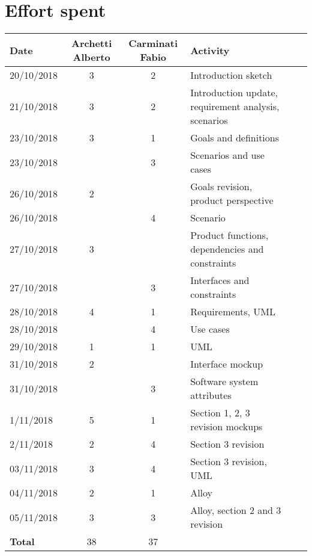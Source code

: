 
\section*{Effort spent}

\label{sec:effort}

\begin{table}[h!]
\centering
\begin{tabularx}{\linewidth}{|l|c|c|X|Xl}
\hline
\textbf{Date}  & \textbf{Archetti Alberto} & \textbf{Carminati Fabio} & \textbf{Activity}                                \\
\hline
20/10/2018  & 3 & 2 & Introduction sketch                                             \\
\hline
21/10/2018 & 3 & 2 & Introduction update, requirement analysis, scenarios          \\
\hline
23/10/2018 & 3 & 1 & Goals and definitions                                             \\
 \hline
23/10/2018 & & 3 & Scenarios and use cases                                         \\
\hline
26/10/2018 & 2 & & Goals revision, product perspective          \\
\hline
26/10/2018 & & 4 & Scenario                                                         \\
 \hline
27/10/2018 & 3 & & Product functions, dependencies and constraints              \\
\hline
27/10/2018 & & 3 &Interfaces and constraints                                        \\
\hline
28/10/2018 & 4 & 1 & Requirements, UML                                               \\
 \hline
28/10/2018 & & 4 & Use cases                                                        \\
\hline
29/10/2018 &1 &1 &UML                                                             \\
\hline
31/10/2018 & 2 & & Interface mockup                                                \\
\hline
31/10/2018 & &3 & Software system attributes                                        \\
 \hline
1/11/2018 & 5 & 1& Section 1, 2, 3 revision mockups \\
 \hline
2/11/2018 & 2 & 4 &Section 3 revision                                                \\
\hline
03/11/2018 & 3 & 4 &Section 3 revision, UML                                       \\
\hline
04/11/2018 &2 & 1 &Alloy                                                             \\
\hline
05/11/2018 & 3 &3 &Alloy, section 2 and 3 revision       \\
\hline
\textbf{Total} & 38 &37 &       \\
\hline


\end{tabularx}

\end{table}
